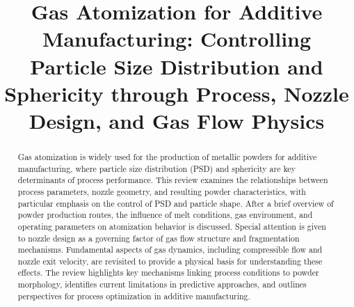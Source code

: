 \documentclass[final,5p,times,twocolumn]{elsarticle}
\begin{document}
\begin{frontmatter}



\title{Gas Atomization for Additive Manufacturing: Controlling Particle Size Distribution and Sphericity through Process, Nozzle Design, and Gas Flow Physics}


\author{} %


\begin{abstract}

Gas atomization is widely used for the production of metallic powders for additive manufacturing, where particle size distribution (PSD) and sphericity are key determinants of process performance. This review examines the relationships between process parameters, nozzle geometry, and resulting powder characteristics, with particular emphasis on the control of PSD and particle shape. After a brief overview of powder production routes, the influence of melt conditions, gas environment, and operating parameters on atomization behavior is discussed. Special attention is given to nozzle design as a governing factor of gas flow structure and fragmentation mechanisms. Fundamental aspects of gas dynamics, including compressible flow and nozzle exit velocity, are revisited to provide a physical basis for understanding these effects. The review highlights key mechanisms linking process conditions to powder morphology, identifies current limitations in predictive approaches, and outlines perspectives for process optimization in additive manufacturing.


\end{abstract}
\end{frontmatter}
\end{document}
